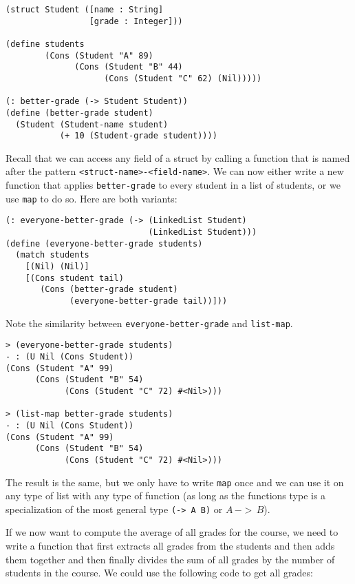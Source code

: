 \documentclass{article}
\begin{document}
\begin{lstlisting}
(struct Student ([name : String]
                 [grade : Integer]))

(define students
        (Cons (Student "A" 89)
              (Cons (Student "B" 44)
                    (Cons (Student "C" 62) (Nil)))))

(: better-grade (-> Student Student))
(define (better-grade student)
  (Student (Student-name student)
           (+ 10 (Student-grade student))))
\end{lstlisting}

Recall that we can access any field of a struct by calling a function that is named after the pattern \texttt{<struct-name>-<field-name>}. We can now either write a new function that applies \lstinline{better-grade} to every student in a list of students, or we use \lstinline{map} to do so. Here are both variants:

\begin{lstlisting}
(: everyone-better-grade (-> (LinkedList Student)
                             (LinkedList Student)))
(define (everyone-better-grade students)
  (match students
    [(Nil) (Nil)]
    [(Cons student tail)
       (Cons (better-grade student)
             (everyone-better-grade tail))]))
\end{lstlisting}

Note the similarity between \lstinline{everyone-better-grade} and \lstinline{list-map}.

\begin{lstlisting}
> (everyone-better-grade students)
- : (U Nil (Cons Student))
(Cons (Student "A" 99)
      (Cons (Student "B" 54)
            (Cons (Student "C" 72) #<Nil>)))

> (list-map better-grade students)
- : (U Nil (Cons Student))
(Cons (Student "A" 99)
      (Cons (Student "B" 54)
            (Cons (Student "C" 72) #<Nil>)))
\end{lstlisting}

The result is the same, but we only have to write \lstinline{map} once and we can use it on any type of list with any type of function (as long as the functions type is a specialization of the most general type \lstinline{(-> A B)} or $A \, -> \, B$).

If we now want to compute the average of all grades for the course, we need to write a function that first extracts all grades from the students and then adds them together and then finally divides the sum of all grades by the number of students in the course. We could use the following code to get all grades:
\end{document}
